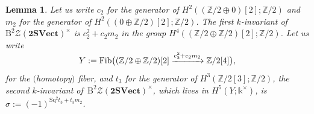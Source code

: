 \documentclass[pdftex]{sigma}
\newtheorem{Lemma}[Theorem]{Lemma}
\numberwithin{equation}{section}
\begin{document}
\begin{Lemma}\label{lem:kinvariantsZ2SVect}
Let us write $c_2$ for the generator of $H^2((\mathbb{Z}/2\oplus 0)[2];\mathbb{Z}/2)$ and $m_2$ for the generator of $H^2((0\oplus \mathbb{Z}/2)[2];\mathbb{Z}/2)$. The first $k$-invariant of $\mathrm{B}^2\mathscr{Z}(\mathbf{2SVect})^{\times}$ is $c_2^2+c_2m_2$ in the group $H^4((\mathbb{Z}/2\oplus\mathbb{Z}/2)[2];\mathbb{Z}/2)$. Let us write \begin{gather*}
\smash{Y:=\mathrm{Fib}\big((\mathbb{Z}/2\oplus\mathbb{Z}/2)[2]\xrightarrow{c_2^2+c_2m_2}\mathbb{Z}/2[4]\big)},
\end{gather*}
 for the $($homotopy$)$ fiber, and $t_3$ for the generator of $H^3(\mathbb{Z}/2[3];\mathbb{Z}/2)$, the second $k$-invariant of~$\mathrm{B}^2\mathscr{Z}(\mathbf{2SVect})^{\times}$, which lives in $H^5(Y;\mathds{k}^{\times})$, is
$\sigma:=(-1)^{\mathrm{Sq}^2t_3 + t_3m_2}$.
\end{Lemma}
\end{document}
